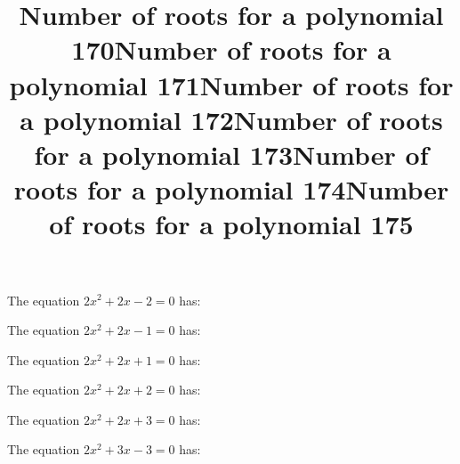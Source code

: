 \documentclass{article}
\begin{document}
\begin{category}
\begin{question}[multichoice]

\end{question}
\begin{question}[multichoice]
\title{Number of roots for a polynomial 170}
The equation $2 x^{2} + 2 x - 2=0$ has:


\end{question}
\begin{question}[multichoice]
\title{Number of roots for a polynomial 171}
The equation $2 x^{2} + 2 x - 1=0$ has:


\end{question}
\begin{question}[multichoice]
\title{Number of roots for a polynomial 172}
The equation $2 x^{2} + 2 x + 1=0$ has:


\end{question}
\begin{question}[multichoice]
\title{Number of roots for a polynomial 173}
The equation $2 x^{2} + 2 x + 2=0$ has:


\end{question}
\begin{question}[multichoice]
\title{Number of roots for a polynomial 174}
The equation $2 x^{2} + 2 x + 3=0$ has:


\end{question}
\begin{question}[multichoice]
\title{Number of roots for a polynomial 175}
The equation $2 x^{2} + 3 x - 3=0$ has:



\end{question}
\end{category}
\end{document}
